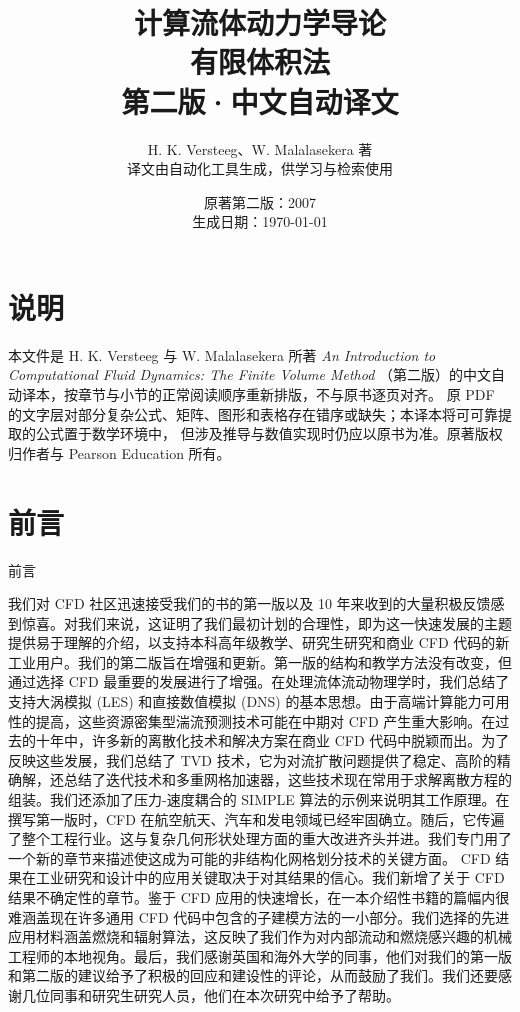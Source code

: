 \documentclass[11pt,a4paper,openany,fontset=none]{ctexbook}
\title{计算流体动力学导论\\\Large 有限体积法\\\large 第二版·中文自动译文}
\author{H. K. Versteeg、W. Malalasekera 著\\\small 译文由自动化工具生成，供学习与检索使用}
\date{原著第二版：2007\\生成日期：\today}
\begin{document}
\frontmatter
\maketitle
\chapter*{说明}
本文件是 H. K. Versteeg 与 W. Malalasekera 所著
\emph{An Introduction to Computational Fluid Dynamics: The Finite Volume Method}
（第二版）的中文自动译本，按章节与小节的正常阅读顺序重新排版，不与原书逐页对齐。
原 PDF 的文字层对部分复杂公式、矩阵、图形和表格存在错序或缺失；本译本将可可靠提取的公式置于数学环境中，
但涉及推导与数值实现时仍应以原书为准。原著版权归作者与 Pearson Education 所有。

\chapter*{前言}

前言

我们对 CFD 社区迅速接受我们的书的第一版以及 10 年来收到的大量积极反馈感到惊喜。对我们来说，这证明了我们最初计划的合理性，即为这一快速发展的主题提供易于理解的介绍，以支持本科高年级教学、研究生研究和商业 CFD 代码的新工业用户。我们的第二版旨在增强和更新。第一版的结构和教学方法没有改变，但通过选择 CFD 最重要的发展进行了增强。在处理流体流动物理学时，我们总结了支持大涡模拟 (LES) 和直接数值模拟 (DNS) 的基本思想。由于高端计算能力可用性的提高，这些资源密集型湍流预测技术可能在中期对 CFD 产生重大影响。在过去的十年中，许多新的离散化技术和解决方案在商业 CFD 代码中脱颖而出。为了反映这些发展，我们总结了 TVD 技术，它为对流扩散问题提供了稳定、高阶的精确解，还总结了迭代技术和多重网格加速器，这些技术现在常用于求解离散方程的组装。我们还添加了压力-速度耦合的 SIMPLE 算法的示例来说明其工作原理。在撰写第一版时，CFD 在航空航天、汽车和发电领域已经牢固确立。随后，它传遍了整个工程行业。这与复杂几何形状处理方面的重大改进齐头并进。我们专门用了一个新的章节来描述使这成为可能的非结构化网格划分技术的关键方面。 CFD 结果在工业研究和设计中的应用关键取决于对其结果的信心。我们新增了关于 CFD 结果不确定性的章节。鉴于 CFD 应用的快速增长，在一本介绍性书籍的篇幅内很难涵盖现在许多通用 CFD 代码中包含的子建模方法的一小部分。我们选择的先进应用材料涵盖燃烧和辐射算法，这反映了我们作为对内部流动和燃烧感兴趣的机械工程师的本地视角。最后，我们感谢英国和海外大学的同事，他们对我们的第一版和第二版的建议给予了积极的回应和建设性的评论，从而鼓励了我们。我们还要感谢几位同事和研究生研究人员，他们在本次研究中给予了帮助。
\end{document}
